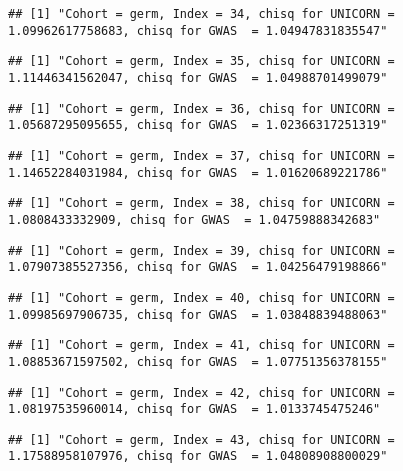 \documentclass[]{article}
\begin{document}
\begin{verbatim}
## [1] "Cohort = germ, Index = 34, chisq for UNICORN = 1.09962617758683, chisq for GWAS  = 1.04947831835547"
\end{verbatim}

\begin{verbatim}
## [1] "Cohort = germ, Index = 35, chisq for UNICORN = 1.11446341562047, chisq for GWAS  = 1.04988701499079"
\end{verbatim}

\begin{verbatim}
## [1] "Cohort = germ, Index = 36, chisq for UNICORN = 1.05687295095655, chisq for GWAS  = 1.02366317251319"
\end{verbatim}

\begin{verbatim}
## [1] "Cohort = germ, Index = 37, chisq for UNICORN = 1.14652284031984, chisq for GWAS  = 1.01620689221786"
\end{verbatim}

\begin{verbatim}
## [1] "Cohort = germ, Index = 38, chisq for UNICORN = 1.0808433332909, chisq for GWAS  = 1.04759888342683"
\end{verbatim}

\begin{verbatim}
## [1] "Cohort = germ, Index = 39, chisq for UNICORN = 1.07907385527356, chisq for GWAS  = 1.04256479198866"
\end{verbatim}

\begin{verbatim}
## [1] "Cohort = germ, Index = 40, chisq for UNICORN = 1.09985697906735, chisq for GWAS  = 1.03848839488063"
\end{verbatim}

\begin{verbatim}
## [1] "Cohort = germ, Index = 41, chisq for UNICORN = 1.08853671597502, chisq for GWAS  = 1.07751356378155"
\end{verbatim}

\begin{verbatim}
## [1] "Cohort = germ, Index = 42, chisq for UNICORN = 1.08197535960014, chisq for GWAS  = 1.0133745475246"
\end{verbatim}

\begin{verbatim}
## [1] "Cohort = germ, Index = 43, chisq for UNICORN = 1.17588958107976, chisq for GWAS  = 1.04808908800029"
\end{verbatim}
\end{document}
